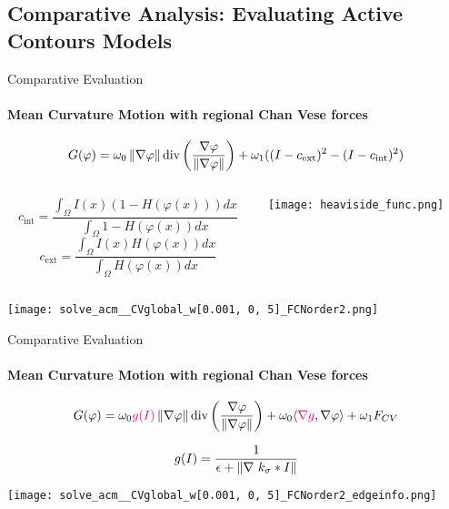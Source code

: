 \subsection{Comparative Analysis: Evaluating Active Contours Models}

\begin{frame}{Comparative Evaluation}
    \framesubtitle{Mean Curvature Motion with  regional Chan Vese forces}

    $$ G(\varphi) = \omega_0\left\lVert\nabla\varphi\right\rVert\textrm{div}\left(\frac{\nabla \varphi}{\left\lVert\nabla\varphi\right\rVert}\right) + \omega_1 ((I - c_{\textrm{ext}})^2 - (I - c_{\textrm{int}})^2 ) $$

    \begin{columns}
        \begin{column}{0.95\textwidth}    
        $$ c_{\textrm{int}} = \frac{\int_{\Omega}I(x)(1 - H(\varphi(x)))dx}{\int_\Omega 1 - H(\varphi(x)) dx} $$
        $$ c_{\textrm{ext}} = \frac{\int_{\Omega}I(x)H(\varphi(x))dx}{\int_\Omega H(\varphi(x)) dx} $$
        \end{column}
        \begin{column}{0.25\textwidth}
        \hspace*{-2cm}\texttt{[image: heaviside\_func.png]}
        \end{column}
    \end{columns}
    \vspace{0.7cm}

    \texttt{[image: solve\_acm\_\_CVglobal\_w[0.001, 0, 5]\_FCNorder2.png]}
\end{frame}

\begin{frame}{Comparative Evaluation}
    \framesubtitle{Mean Curvature Motion with  regional Chan Vese forces }

    $$ G(\varphi) = \omega_0\textcolor{magenta}{g(I)}\left\lVert\nabla\varphi\right\rVert\textrm{div}\left(\frac{\nabla \varphi}{\left\lVert\nabla\varphi\right\rVert}\right) + \omega_0\langle \textcolor{magenta}{\nabla g}, \nabla\varphi \rangle +  \omega_1 F_{CV}  $$

    $$ g(I) = \frac{1}{\epsilon + \norm{\nabla\ k_\sigma * I}} $$


    \vspace{0.7cm}

    \texttt{[image: solve\_acm\_\_CVglobal\_w[0.001, 0, 5]\_FCNorder2\_edgeinfo.png]}
\end{frame}

